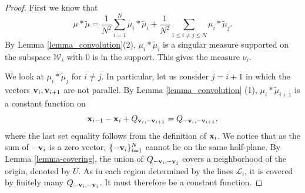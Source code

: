 \documentclass[12pt,a4paper,oneside]{amsart}
\theoremstyle{definition}
\newcommand{\wt}[1]{\widetilde{#1}}
\begin{document}
\begin{proof}
  First we know that 
  $$
 \mu\ast\wt{\mu} = \frac1{N^2}\sum_{i=1}^N\mu_i\ast\wt\mu_i+ \frac{1}{N^2}\sum_{1\le i\ne j\le N} \mu_i\ast\wt\mu_j.
$$
By Lemma \ref{lemma_convolution}(2), $\mu_{i}\ast\wt{\mu}_i$ is a singular measure supported on the subspace ${\mathcal W}_i$ with $0$ is in the support. This gives the measure $\nu_i$. 

We look at $\mu_i\ast\wt\mu_j$ for $i\ne j$. In particular, let us consider $j = i+1$ in which the vectors ${\bf v}_i,{\bf v}_{i+1}$ are not parallel. By Lemma \ref{lemma_convolution} (1), $\mu_i\ast\wt\mu_{i+1}$ is a constant function on 
$$
{\bf x}_{i-1}-{\bf x}_i+ Q_{{\bf v}_i,-{\bf v}_{i+1}} = Q_{-{\bf v}_i,-{\bf v}_{i+1}},
$$
where the last set equality follows from the definition of ${\bf x}_i$. We notice that as the sum of $-{\bf v}_i$ is a zero vector, $\{-{\bf v}_i\}_{i=1}^N$ cannot lie on the same half-plane. By Lemma \ref{lemma-covering}, the union of $Q_{-{\bf v}_i,-{\bf v}_j}$ covers a neighborhood of the origin, denoted by $U$. As in each region determined by the lines ${\mathcal L}_i$, it is covered by finitely many $Q_{-{\bf v}_i,-{\bf v}_j}$. It must therefore be a constant function. 
\end{proof}
\end{document}
